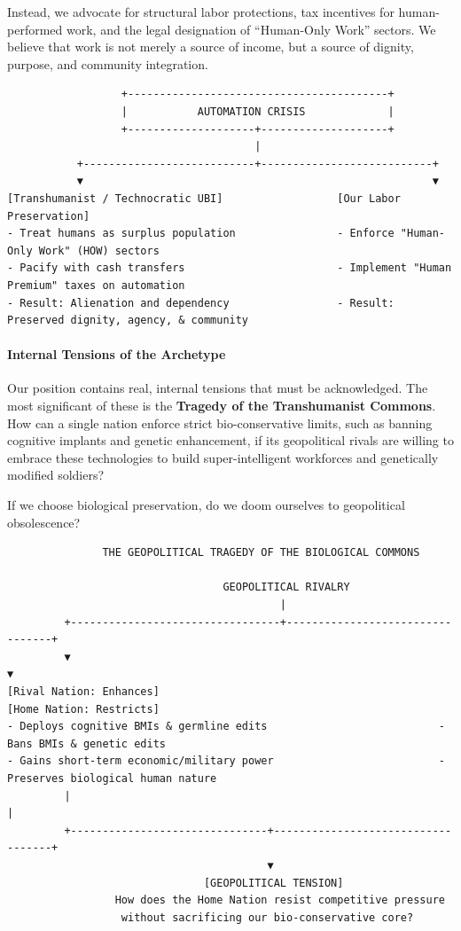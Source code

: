 Instead, we advocate for structural labor protections, tax incentives
for human-performed work, and the legal designation of ``Human-Only
Work'' sectors. We believe that work is not merely a source of income,
but a source of dignity, purpose, and community integration.

\begin{verbatim}
                  +-----------------------------------------+
                  |           AUTOMATION CRISIS             |
                  +--------------------+--------------------+
                                       |
           +---------------------------+---------------------------+
           ▼                                                       ▼
[Transhumanist / Technocratic UBI]                  [Our Labor Preservation]
- Treat humans as surplus population                - Enforce "Human-Only Work" (HOW) sectors
- Pacify with cash transfers                        - Implement "Human Premium" taxes on automation
- Result: Alienation and dependency                 - Result: Preserved dignity, agency, & community
\end{verbatim}

\paragraph{Internal Tensions of the
Archetype}\label{internal-tensions-of-the-archetype}

Our position contains real, internal tensions that must be acknowledged.
The most significant of these is the \textbf{Tragedy of the
Transhumanist Commons}. How can a single nation enforce strict
bio-conservative limits, such as banning cognitive implants and genetic
enhancement, if its geopolitical rivals are willing to embrace these
technologies to build super-intelligent workforces and genetically
modified soldiers?

If we choose biological preservation, do we doom ourselves to
geopolitical obsolescence?

\begin{verbatim}
               THE GEOPOLITICAL TRAGEDY OF THE BIOLOGICAL COMMONS

                                  GEOPOLITICAL RIVALRY
                                           |
         +---------------------------------+---------------------------------+
         ▼                                                                   ▼
[Rival Nation: Enhances]                                            [Home Nation: Restricts]
- Deploys cognitive BMIs & germline edits                           - Bans BMIs & genetic edits
- Gains short-term economic/military power                          - Preserves biological human nature
         |                                                                   |
         +-------------------------------+-----------------------------------+
                                         ▼
                               [GEOPOLITICAL TENSION]
                 How does the Home Nation resist competitive pressure
                  without sacrificing our bio-conservative core?
\end{verbatim}

